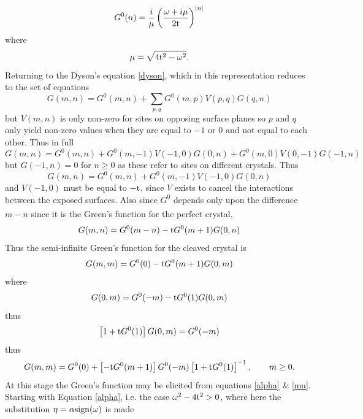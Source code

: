 \documentclass[a4paper, 12pt]{article}
\begin{document}
\begin{equation}\label{mu}
G^0 (n) = \frac{i}{\mu}\left( \frac{\omega+i\mu}{2\rm t}\right)^{|n|} 
\end{equation}
where 
\begin{equation}
	\mu = \sqrt{4{\rm t}^2-\omega^2} .
\end{equation}
Returning to the Dyson's equation \eqref{dyson}, which in this representation reduces to the set of equations
\begin{equation}\label{Gsum}
G(m,n)=G^0(m,n)+\sum_{p,q} G^0 (m,p)V(p,q)G(q,n)
\end{equation}
but $V(m,n)$ is only non-zero for sites on opposing surface planes so $p$ and $q$ only yield non-zero values when they are equal to $-1$ or $0$ and not equal to each other. Thus in full
\begin{equation}
G(m,n)=G^0(m,n)+G^0 (m,-1)V(-1,0)G(0,n) +G^0 (m,0)V(0,-1)G(-1,n)
\end{equation} 
but $G(-1,n)=0$ for $n \geq 0 $ as these refer to sites on different crystals. Thus
\begin{equation}\label{GGG}
G(m,n)=G^0(m,n)+G^0 (m,-1)V(-1,0)G(0,n)
\end{equation}
and $V(-1,0)$ must be equal to $-\rm t$, since $V$ exists to cancel the interactions between the exposed surfaces. Also since $G^0$ depends only upon the difference $m-n$ since it is the Green's function for the perfect crystal\textcolor{blue}{\textsuperscript{\cite{KS}}},
\begin{equation}
	G(m,n)=G^0(m-n)-{\rm t} G^0 (m+1)G(0,n)
\end{equation}
Thus the semi-infinite Green's function for the cleaved crystal is
\begin{equation}
	G(m,m)=G^0(0)-{\rm t} G^0 (m+1)G(0,m)
\end{equation}
where
\begin{equation}
	G(0,m)=G^0(-m)-{\rm t} G^0 (1)G(0,m)
\end{equation}
thus
\begin{equation}
	\left[1+ {\rm t}G^0 (1)\right]G(0,m) =G^0 (-m)
\end{equation}
thus
\begin{equation}\label{G}
	G(m,m)=G^0(0)+\left[-{\rm t} G^0 (m+1)\right] G^0(-m)\left[1+ {\rm t}G^0 (1)\right]^{-1}, \qquad m\geq 0.
\end{equation}
At this stage the Green's function may be elicited from equations \eqref{alpha} \& \eqref{mu}. Starting with Equation \eqref{alpha}, i.e. the case $\omega^2-4{\rm t}^2>0$,  where here the substitution $\eta = \alpha \rm{sign}(\omega)$ is made
\end{document}
